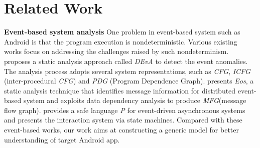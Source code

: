 \section{Related Work}
\textbf{Event-based system analysis}
One problem in event-based system such as Android is that the program execution is nondeterministic. Various existing works focus on addressing the challenges raised by such nondeterminism. \cite{new2015anomalies} proposes a static analysis approach called \textit{DEvA} to detect the event anomalies. The analysis process adopts several system representations, such as \textit{CFG}, \textit{ICFG} (inter-procedural \textit{CFG}) and \textit{PDG} (Program Dependence Graph). \cite{new2013identifying} presents \textit{Eos}, a static analysis technique that identifies message information for distributed event-based system and exploits data dependency analysis to produce \textit{MFG}(message flow graph). \cite{new2013p} provides a safe language \textit{P} for event-driven asynchronous systems and presents the interaction system via state machines. Compared with these event-based works, our work aims at constructing a generic model for better understanding of target Android app.

